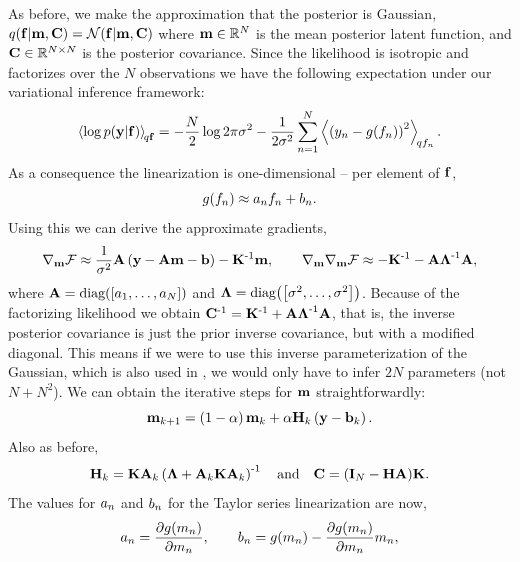 \documentclass{article} %
\begin{document}
As before, we make the approximation that the posterior is Gaussian,
$\qrobC{\lstate}{\pomean, \pocov} = \gausC{\lstate}{\pomean, \pocov}$ where
$\pomean \in \real{N}$ is the mean posterior latent function, and $\pocov \in
\real{N \times N}$ is the posterior covariance. Since the likelihood is
isotropic and factorizes over the $N$  observations 
we have the following expectation under
our variational inference framework:
\begin{equation*}
    \expec{q\lstate}{\log\probC{\obs}{\lstate}} =
        - \frac{N}{2}\log{2\pi\lvar}
        - \frac{1}{2\lvar} \sum_{n=1}^N 
            \expec{q\lstates_n}{\brac{\obss_n - \nonlin{\lstates_n}}^2}.
\end{equation*}
As a consequence the linearization is one-dimensional -- per element of 
$\lstate$,
\begin{equation}
    \nonlin{\lstates_n} \approx \Lins_n\lstates_n + \intcpts_n.
\end{equation}
Using this we can derive the approximate gradients,
\begin{equation}
    \nabla_\pomean\Fengy \approx \frac{1}{\lvar}\Linmat\brac{\obs -
        \Linmat\pomean - \intcpt} - \KERNL\inv\pomean,
    \qquad
    \nabla_\pomean\nabla_\pomean \Fengy \approx -\KERNL\inv
    -\Linmat\Lvar\inv\Linmat,
\end{equation}
where $\Linmat = \diag{\sbrac{\Lins_1, \ldots, \Lins_N}}$ and $\Lvar =
\diag{\sbrac{\lvar, \ldots, \lvar}}$. Because of the factorizing likelihood we
obtain $\pocov\inv = \KERNL\inv + \Linmat\Lvar\inv\Linmat$, that is, the
inverse posterior covariance is just the prior inverse covariance, but with a
modified diagonal. This means if we were to use this inverse parameterization
of the Gaussian, which is also used in \cite{Opper2009}, we would
 only have to infer $2N$ parameters (not $N + N^2$).
 We can obtain the iterative steps for $\pomean$ straightforwardly:
\begin{equation}
    \pomean_{k+1} = \brac{1-\step}\pomean_k 
        + \step\Kgain_k\brac{\obs - \intcpt_k}.
    \label{eq:pomeangp}
\end{equation}
Also as before,
\begin{equation}
    \Kgain_k = \KERNL\Linmat_k\brac{\Lvar + \Linmat_k\KERNL\Linmat_k}\inv
    \quad \text{and} \quad
    \pocov = \brac{\ident{N} - \Kgain\Linmat}\!\KERNL.
    \label{eq:pocovgp}
\end{equation}
The values for $\Lins_n$ and $\intcpts_n$ for the Taylor series linearization
are now,
\begin{equation}
    \Lins_n = \frac{\partial\nonlin{\pomeans_n}}{\partial\pomeans_n},
    \qquad
    \intcpts_n = \nonlin{\pomeans_n}
        - \frac{\partial\nonlin{\pomeans_n}}{\partial\pomeans_n} \pomeans_n,
\end{equation}
\end{document}
